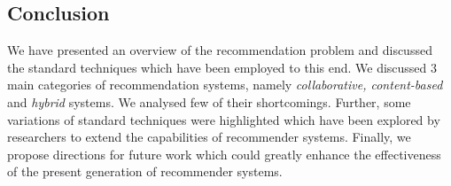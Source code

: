 \subsection{Conclusion}
We have presented an overview of the recommendation problem and discussed the standard techniques which have been employed to this end. We discussed 3 main categories of recommendation systems, namely \textit{collaborative, content-based} and \textit{hybrid} systems. We analysed few of their shortcomings. Further, some variations of standard techniques were highlighted which have been explored by researchers to extend the capabilities of recommender systems. Finally, we propose directions for future work which could greatly enhance the effectiveness of the present generation of recommender systems.